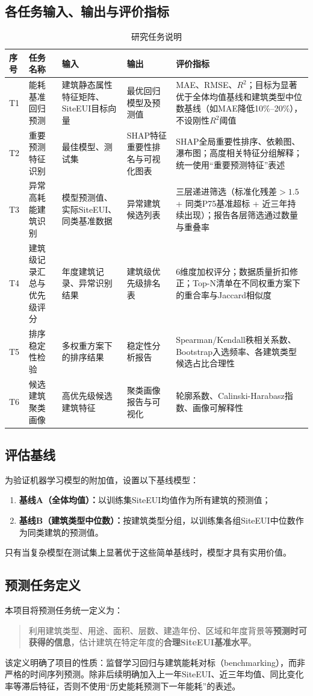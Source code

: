 \subsection{各任务输入、输出与评价指标}

\begin{table}[H]
\centering
\caption{研究任务说明}
\label{tab:task_io}
\begin{tabular}{p{0.8cm}p{2.5cm}p{2.5cm}p{2.5cm}p{3.5cm}}
\hline
\textbf{序号} & \textbf{任务名称} & \textbf{输入} & \textbf{输出} & \textbf{评价指标} \\
\hline
T1 & 能耗基准回归预测 & 建筑静态属性特征矩阵、SiteEUI目标向量 & 最优回归模型及预测值 & MAE、RMSE、$R^2$；目标为显著优于全体均值基线和建筑类型中位数基线（如MAE降低10\%--20\%），不设刚性$R^2$阈值 \\
\hline
T2 & 重要预测特征识别 & 最佳模型、测试集 & SHAP特征重要性排名与可视化图表 & SHAP全局重要性排序、依赖图、瀑布图；高度相关特征分组解释；统一使用``重要预测特征''表述 \\
\hline
T3 & 异常高耗能建筑识别 & 模型预测值、实际SiteEUI、同类基准数据 & 异常建筑候选列表 & 三层递进筛选（标准化残差$>1.5$ + 同类P75基准超标 + 近三年持续出现）；报告各层筛选通过数量与重叠率 \\
\hline
T4 & 建筑级记录汇总与优先级评分 & 年度建筑记录、异常识别结果 & 建筑级优先级排名表 & 6维度加权评分；数据质量折扣修正；Top-N清单在不同权重方案下的重合率与Jaccard相似度 \\
\hline
T5 & 排序稳定性检验 & 多权重方案下的排序结果 & 稳定性分析报告 & Spearman/Kendall秩相关系数、Bootstrap入选频率、各建筑类型候选占比合理性 \\
\hline
T6 & 候选建筑聚类画像 & 高优先级候选建筑特征 & 聚类画像报告与可视化 & 轮廓系数、Calinski-Harabasz指数、画像可解释性 \\
\hline
\end{tabular}
\end{table}

\subsection{评估基线}

为验证机器学习模型的附加值，设置以下基线模型：

\begin{enumerate}
    \item \textbf{基线A（全体均值）：}以训练集SiteEUI均值作为所有建筑的预测值；
    \item \textbf{基线B（建筑类型中位数）：}按建筑类型分组，以训练集各组SiteEUI中位数作为同类建筑的预测值。
\end{enumerate}

只有当复杂模型在测试集上显著优于这些简单基线时，模型才具有实用价值。

\subsection{预测任务定义}

本项目将预测任务统一定义为：

\begin{quote}
利用建筑类型、用途、面积、层数、建造年份、区域和年度背景等\textbf{预测时可获得的信息}，估计建筑在特定年度的\textbf{合理SiteEUI基准水平}。
\end{quote}

该定义明确了项目的性质：监督学习回归与建筑能耗对标（benchmarking），而非严格的时间序列预测。除非后续明确加入上一年SiteEUI、近三年均值、同比变化率等滞后特征，否则不使用``历史能耗预测下一年能耗''的表述。
